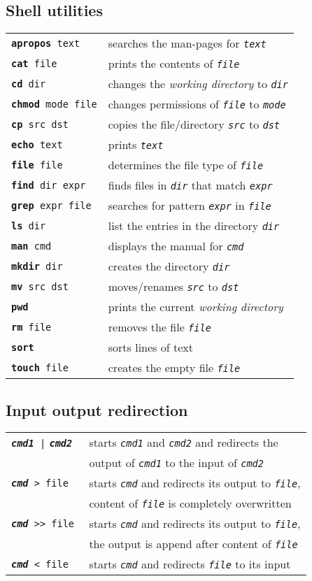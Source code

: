 \documentclass[landscape, a4paper]{article}
\newcommand{\cv}[1]{\textit{\texttt{#1}}}
\newcommand{\shcmd}[2]{\texttt{\textbf{#1} #2}}
\begin{document}
\begin{multicols*}{3}
\subsection*{Shell utilities}
\begin{tabular}{ll}
\shcmd{apropos}{text} 				& searches the man-pages for \cv{text}\\
\shcmd{cat}{file} 				& prints the contents of \cv{file}\\
\shcmd{cd}{dir} 				& changes the \textit{working directory} to \cv{dir}\\
\shcmd{chmod}{mode file} 	    & changes permissions of \cv{file} to \cv{mode}\\
\shcmd{cp}{src dst} 		    & copies the file/directory \cv{src} to \cv{dst}\\
\shcmd{echo}{text} 			    & prints \cv{text}\\
\shcmd{file}{file} 			    & determines the file type of \cv{file}\\
\shcmd{find}{dir expr} 	        & finds files in \cv{dir} that match \cv{expr}\\
\shcmd{grep}{expr file} 	    & searches for pattern \cv{expr} in \cv{file}\\
\shcmd{ls}{dir} 				& list the entries in the directory \cv{dir}\\
\shcmd{man}{cmd} 				& displays the manual for \cv{cmd}\\
\shcmd{mkdir}{dir} 			    & creates the directory \cv{dir}\\
\shcmd{mv}{src dst} 		    & moves/renames \cv{src} to \cv{dst}\\
\shcmd{pwd}{} 					& prints the current \textit{working directory}\\
\shcmd{rm}{file} 				& removes the file \cv{file}\\
\shcmd{sort}{} 			& sorts lines of text\\
\shcmd{touch}{file} 			& creates the empty file \cv{file}
\end{tabular}
\subsection*{Input output redirection}
\begin{tabular}{ll}
\shcmd{\cv{cmd1}}{|} \shcmd{\cv{cmd2}}{} & starts \cv{cmd1} and \cv{cmd2} and redirects the\\
		        			  	& output of \cv{cmd1} to the input of \cv{cmd2}\\
\shcmd{\cv{cmd}}{> file} 	    & starts \cv{cmd} and redirects its output to \cv{file},\\
	        		       		& content of \cv{file} is completely overwritten\\
\shcmd{\cv{cmd}}{>\null> file} 	& starts \cv{cmd} and redirects its output to \cv{file},\\
        			    		& the output is append after content of \cv{file}\\
\shcmd{\cv{cmd}}{< file}	    & starts \cv{cmd} and redirects \cv{file} to its input
					  

\end{tabular}
\end{multicols*}
\end{document}
